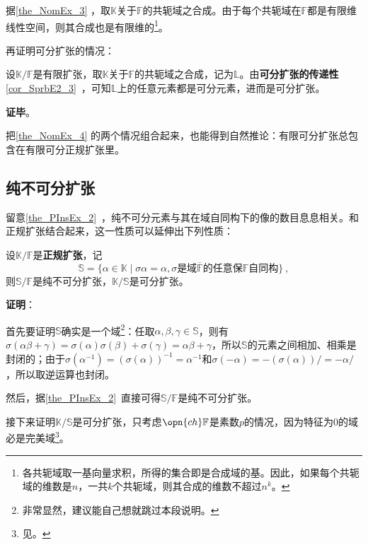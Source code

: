 据\autoref{the_NomEx_3} ，取$\mathbb{K}$关于$\mathbb{F}$的共轭域之合成。由于每个共轭域在$\mathbb{F}$都是有限维线性空间，则其合成也是有限维的\footnote{各共轭域取一基向量求积，所得的集合即是合成域的基。因此，如果每个共轭域的维数是$n$，一共$k$个共轭域，则其合成的维数不超过$n^k$。}。

再证明可分扩张的情况：

设$\mathbb{K}/\mathbb{F}$是有限扩张，取$\mathbb{K}$关于$\mathbb{F}$的共轭域之合成，记为$\mathbb{L}$。由\textbf{可分扩张的传递性}\autoref{cor_SprbE2_3}~，可知$\mathbb{L}$上的任意元素都是可分元素，进而是可分扩张。

\textbf{证毕}。

把\autoref{the_NomEx_4} 的两个情况组合起来，也能得到自然推论：有限可分扩张总包含在有限可分正规扩张里。


\subsection{纯不可分扩张}



留意\autoref{the_PInsEx_2}~，纯不可分元素与其在域自同构下的像的数目息息相关。和正规扩张结合起来，这一性质可以延伸出下列性质：

\begin{theorem}{}\label{the_NomEx_5}
设$\mathbb{K}/\mathbb{F}$是\textbf{正规扩张}，记
\begin{equation}\label{eq_NomEx_1}
\mathbb{S}=\{\alpha\in\mathbb{K}\mid \sigma\alpha = \alpha, \sigma\text{是域}\overline{\mathbb{F}}\text{的任意保}\mathbb{F}\text{自同构}\}~,
\end{equation}
则$\mathbb{S}/\mathbb{F}$是纯不可分扩张，$\mathbb{K}/\mathbb{S}$是可分扩张。
\end{theorem}

\textbf{证明}：

首先要证明$\mathbb{S}$确实是一个域\footnote{非常显然，建议能自己想就跳过本段说明。}：任取$\alpha, \beta, \gamma\in\mathbb{S}$，则有$\sigma(\alpha\beta+\gamma)=\sigma(\alpha)\sigma(\beta)+\sigma(\gamma)=\alpha\beta+\gamma$，所以$\mathbb{S}$的元素之间相加、相乘是封闭的；由于$\sigma(\alpha^{-1})=(\sigma(\alpha))^{-1}=\alpha^{-1}$和$\sigma(-\alpha)=-(\sigma(\alpha))/=-\alpha/$，所以取逆运算也封闭。

然后，据\autoref{the_PInsEx_2}~直接可得$\mathbb{S}/\mathbb{F}$是纯不可分扩张。

接下来证明$\mathbb{K}/\mathbb{S}$是可分扩张，只考虑$\opn{ch}\mathbb{F}$是素数$p$的情况，因为特征为$0$的域必是完美域\footnote{见。}。

